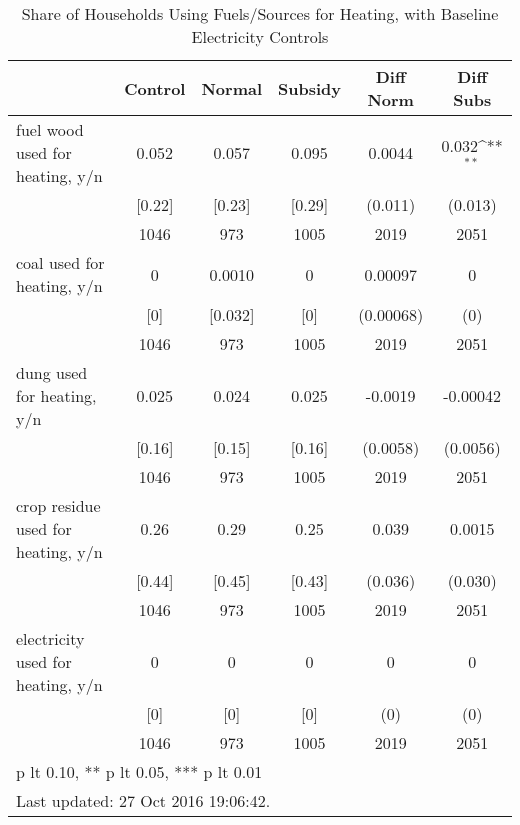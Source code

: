 \begin{table}[htbp]\centering
\def\sym#1{\ifmmode^{#1}\else\(^{#1}\)\fi}
\caption{Share of Households Using Fuels/Sources for Heating, with Baseline Electricity Controls \label{tab:"balance"}}
\begin{tabular*}{0.9\hsize}{@{\hskip\tabcolsep\extracolsep\fill}l*{1}{ccccc}}
\toprule
                                &  Control&   Normal&  Subsidy&Diff Norm         &Diff Subs         \\
\midrule
fuel wood used for heating, y/n &    0.052&    0.057&    0.095&   0.0044         &    0.032\sym{**} \\
                                &   [0.22]&   [0.23]&   [0.29]&  (0.011)         &  (0.013)         \\
                                &     1046&      973&     1005&     2019         &     2051         \\
coal used for heating, y/n      &        0&   0.0010&        0&  0.00097         &        0         \\
                                &      [0]&  [0.032]&      [0]&(0.00068)         &      (0)         \\
                                &     1046&      973&     1005&     2019         &     2051         \\
dung used for heating, y/n      &    0.025&    0.024&    0.025&  -0.0019         & -0.00042         \\
                                &   [0.16]&   [0.15]&   [0.16]& (0.0058)         & (0.0056)         \\
                                &     1046&      973&     1005&     2019         &     2051         \\
crop residue used for heating, y/n&     0.26&     0.29&     0.25&    0.039         &   0.0015         \\
                                &   [0.44]&   [0.45]&   [0.43]&  (0.036)         &  (0.030)         \\
                                &     1046&      973&     1005&     2019         &     2051         \\
electricity used for heating, y/n&        0&        0&        0&        0         &        0         \\
                                &      [0]&      [0]&      [0]&      (0)         &      (0)         \\
                                &     1046&      973&     1005&     2019         &     2051         \\
\bottomrule
\multicolumn{6}{l}{\footnotesize * p lt 0.10, ** p lt 0.05, *** p lt 0.01}\\
\multicolumn{6}{l}{\footnotesize Last updated: 27 Oct 2016 19:06:42.}\\
\end{tabular*}
\end{table}
